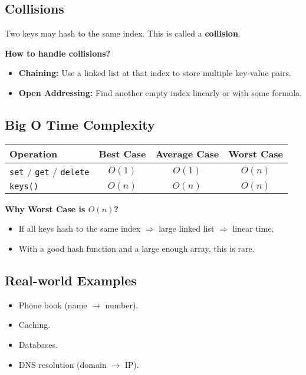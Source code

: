 \subsection{Collisions}
Two keys may hash to the same index. This is called a \textbf{collision}.

\textbf{How to handle collisions?}
\begin{itemize}
    \item \textbf{Chaining:} Use a linked list at that index to store multiple key-value pairs.
    \item \textbf{Open Addressing:} Find another empty index linearly or with some formula.
\end{itemize}

\subsection{Big O Time Complexity}
\begin{center}
    \begin{tabular}{|l|c|c|c|}
        \hline
        \textbf{Operation} & \textbf{Best Case} & \textbf{Average Case} & \textbf{Worst Case} \\
        \hline
        \texttt{set} / \texttt{get} / \texttt{delete} & $O(1)$ & $O(1)$ & $O(n)$ \\
        \hline
        \texttt{keys()} & $O(n)$ & $O(n)$ & $O(n)$ \\
        \hline
    \end{tabular}
\end{center}

\textbf{Why Worst Case is $O(n)$?}
\begin{itemize}
    \item If all keys hash to the same index $\Rightarrow$ large linked list $\Rightarrow$ linear time.
    \item With a good hash function and a large enough array, this is rare.
\end{itemize}

\subsection{Real-world Examples}
\begin{itemize}
    \item Phone book (name $\rightarrow$ number).
    \item Caching.
    \item Databases.
    \item DNS resolution (domain $\rightarrow$ IP).
\end{itemize}
